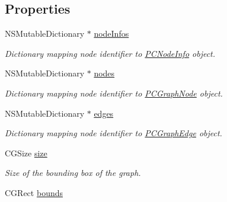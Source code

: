 \subsection*{Properties}
\begin{DoxyCompactItemize}
\item 
\hypertarget{interface_p_c_graph_model_a4b70f8cd855b30fc26a9706796f5b6da}{
NSMutableDictionary $\ast$ \hyperlink{interface_p_c_graph_model_a4b70f8cd855b30fc26a9706796f5b6da}{nodeInfos}}
\label{interface_p_c_graph_model_a4b70f8cd855b30fc26a9706796f5b6da}

\begin{DoxyCompactList}\small\item\em Dictionary mapping node identifier to \hyperlink{interface_p_c_node_info}{PCNodeInfo} object. \end{DoxyCompactList}\item 
\hypertarget{interface_p_c_graph_model_a555c0cccf5fb4396269b94500ea27426}{
NSMutableDictionary $\ast$ \hyperlink{interface_p_c_graph_model_a555c0cccf5fb4396269b94500ea27426}{nodes}}
\label{interface_p_c_graph_model_a555c0cccf5fb4396269b94500ea27426}

\begin{DoxyCompactList}\small\item\em Dictionary mapping node identifier to \hyperlink{interface_p_c_graph_node}{PCGraphNode} object. \end{DoxyCompactList}\item 
\hypertarget{interface_p_c_graph_model_aaa7ff1c7de5b8515125ac5f9457db889}{
NSMutableDictionary $\ast$ \hyperlink{interface_p_c_graph_model_aaa7ff1c7de5b8515125ac5f9457db889}{edges}}
\label{interface_p_c_graph_model_aaa7ff1c7de5b8515125ac5f9457db889}

\begin{DoxyCompactList}\small\item\em Dictionary mapping node identifier to \hyperlink{interface_p_c_graph_edge}{PCGraphEdge} object. \end{DoxyCompactList}\item 
\hypertarget{interface_p_c_graph_model_a9b9c51275edf855f0915b0a71fd826f5}{
CGSize \hyperlink{interface_p_c_graph_model_a9b9c51275edf855f0915b0a71fd826f5}{size}}
\label{interface_p_c_graph_model_a9b9c51275edf855f0915b0a71fd826f5}

\begin{DoxyCompactList}\small\item\em Size of the bounding box of the graph. \end{DoxyCompactList}\item 
\hypertarget{interface_p_c_graph_model_a1918ad14652a1ea5508da442e5e9c500}{
CGRect \hyperlink{interface_p_c_graph_model_a1918ad14652a1ea5508da442e5e9c500}{bounds}}
\label{interface_p_c_graph_model_a1918ad14652a1ea5508da442e5e9c500}


\end{DoxyCompactItemize}
